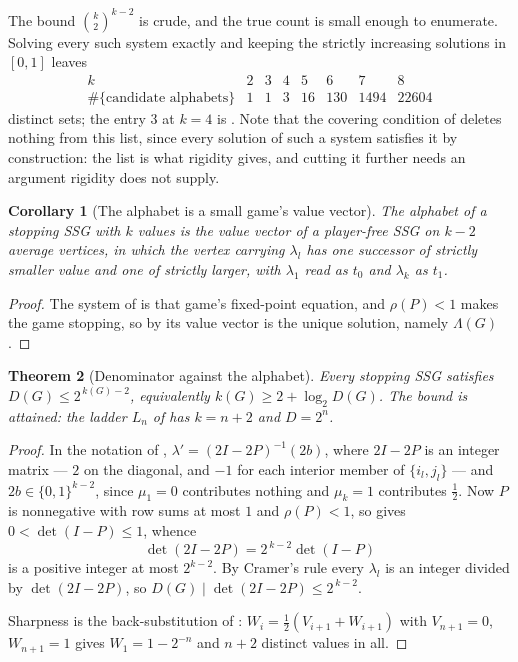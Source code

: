 \documentclass[11pt]{article}
\theoremstyle{plain}
\newtheorem{theorem}{Theorem}[section]
\newtheorem{corollary}[theorem]{Corollary}
\theoremstyle{definition}
\begin{document}
The bound $\binom{k}{2}^{k-2}$ is crude, and the true count is small enough
to enumerate. Solving every such system exactly and keeping the strictly
increasing solutions in $[0,1]$ leaves
\[
 \begin{array}{c|ccccccc}
  k & 2&3&4&5&6&7&8\\\hline
  \#\{\text{candidate alphabets}\} & 1&1&3&16&130&1494&22604
 \end{array}
\]
distinct sets; the entry $3$ at $k=4$ is . Note
that the covering condition of  deletes nothing
from this list, since every solution of such a system satisfies it by
construction: the list is what rigidity gives, and cutting it further needs
an argument rigidity does not supply.

\begin{corollary}[The alphabet is a small game's value vector]\label{cor:alphabet-chain}
The alphabet of a stopping SSG with $k$ values is the value vector of a
\emph{player-free} SSG on $k-2$ average vertices, in which the vertex
carrying $\lambda_l$ has one successor of strictly smaller value and one
of strictly larger, with $\lambda_1$ read as $t_0$ and $\lambda_k$ as
$t_1$.
\end{corollary}

\begin{proof}
The system of  is that game's fixed-point
equation, and $\rho(P)<1$ makes the game stopping, so by
 its value vector is the unique solution, namely
$\Lambda(G)$.
\end{proof}

\begin{theorem}[Denominator against the alphabet]\label{thm:alphabet-denominator}
Every stopping SSG satisfies $D(G)\le2^{\,k(G)-2}$, equivalently
$k(G)\ge2+\log_2 D(G)$. The bound is attained: the ladder $L_n$ of
 has $k=n+2$ and $D=2^{n}$.
\end{theorem}

\begin{proof}
In the notation of , $\lambda'=(2I-2P)^{-1}(2b)$,
where $2I-2P$ is an integer matrix --- $2$ on the diagonal, and $-1$ for
each interior member of $\{i_l,j_l\}$ --- and $2b\in\{0,1\}^{k-2}$,
since $\mu_1=0$ contributes nothing and $\mu_k=1$ contributes $\tfrac12$.
Now $P$ is nonnegative with row sums at most $1$ and $\rho(P)<1$, so
 gives $0<\det(I-P)\le1$, whence
\[
  \det(2I-2P)=2^{\,k-2}\det(I-P)
\]
is a positive integer at most $2^{k-2}$. By Cramer's rule every
$\lambda_l$ is an integer divided by $\det(2I-2P)$, so
$D(G)\mid\det(2I-2P)\le2^{\,k-2}$.

Sharpness is the back-substitution of :
$W_i=\tfrac12(V_{i+1}+W_{i+1})$ with $V_{n+1}=0$, $W_{n+1}=1$ gives
$W_1=1-2^{-n}$ and $n+2$ distinct values in all.
\end{proof}
\end{document}
